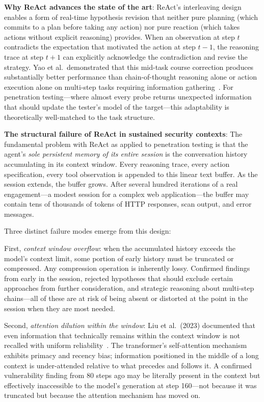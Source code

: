 \documentclass[12pt,a4paper,oneside,openany]{book}
\newcommand{\term}[1]{\textit{#1}}
\begin{document}
\textbf{Why ReAct advances the state of the art}: ReAct's interleaving design enables a form of real-time hypothesis revision that neither pure planning (which commits to a plan before taking any action) nor pure reaction (which takes actions without explicit reasoning) provides. When an observation at step $t$ contradicts the expectation that motivated the action at step $t-1$, the reasoning trace at step $t+1$ can explicitly acknowledge the contradiction and revise the strategy. Yao et al.\ demonstrated that this mid-task course correction produces substantially better performance than chain-of-thought reasoning alone or action execution alone on multi-step tasks requiring information gathering~\citep{yao2022react}. For penetration testing---where almost every probe returns unexpected information that should update the tester's model of the target---this adaptability is theoretically well-matched to the task structure.

\textbf{The structural failure of ReAct in sustained security contexts}: The fundamental problem with ReAct as applied to penetration testing is that the agent's \textit{sole persistent memory of its entire session} is the conversation history accumulating in its context window. Every reasoning trace, every action specification, every tool observation is appended to this linear text buffer. As the session extends, the buffer grows. After several hundred iterations of a real engagement---a modest session for a complex web application---the buffer may contain tens of thousands of tokens of HTTP responses, scan output, and error messages.

Three distinct failure modes emerge from this design:

First, \term{context window overflow}: when the accumulated history exceeds the model's context limit, some portion of early history must be truncated or compressed. Any compression operation is inherently lossy. Confirmed findings from early in the session, rejected hypotheses that should exclude certain approaches from further consideration, and strategic reasoning about multi-step chains---all of these are at risk of being absent or distorted at the point in the session when they are most needed.

Second, \term{attention dilution within the window}: Liu et al.\ (2023) documented that even information that technically remains within the context window is not recalled with uniform reliability~\citep{liu2023lost}. The transformer's self-attention mechanism exhibits primacy and recency bias; information positioned in the middle of a long context is under-attended relative to what precedes and follows it. A confirmed vulnerability finding from 80 steps ago may be literally present in the context but effectively inaccessible to the model's generation at step 160---not because it was truncated but because the attention mechanism has moved on.
\end{document}
